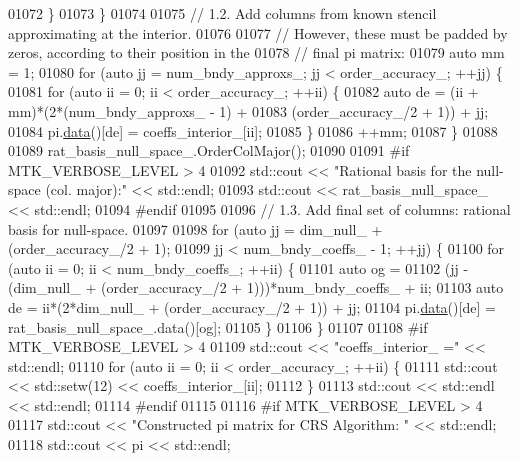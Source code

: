 \begin{DoxyCode}
{{01072     \}
01073   \}
01074 
01075   \textcolor{comment}{// 1.2. Add columns from known stencil approximating at the interior.}
01076 
01077   \textcolor{comment}{// However, these must be padded by zeros, according to their position in the}
01078   \textcolor{comment}{// final pi matrix:}
01079   \textcolor{keyword}{auto} mm = 1;
01080   \textcolor{keywordflow}{for} (\textcolor{keyword}{auto} jj = num\_bndy\_approxs\_; jj < order\_accuracy\_; ++jj) \{
01081     \textcolor{keywordflow}{for} (\textcolor{keyword}{auto} ii = 0; ii < order\_accuracy\_; ++ii) \{
01082       \textcolor{keyword}{auto} de = (ii + mm)*(2*(num\_bndy\_approxs\_ - 1) +
01083         (order\_accuracy\_/2 + 1)) + jj;
01084       pi.\hyperlink{classmtk_1_1DenseMatrix_a0c33b8a9e01d157c61ddbdf807c25d84}{data}()[de] = coeffs\_interior\_[ii];
01085     \}
01086     ++mm;
01087   \}
01088 
01089   rat\_basis\_null\_space\_.OrderColMajor();
01090 
01091 \textcolor{preprocessor}{  #if MTK\_VERBOSE\_LEVEL > 4}
01092   std::cout << \textcolor{stringliteral}{"Rational basis for the null-space (col. major):"} << std::endl;
01093   std::cout << rat\_basis\_null\_space\_ << std::endl;
01094 \textcolor{preprocessor}{  #endif}
01095 
01096   \textcolor{comment}{// 1.3. Add final set of columns: rational basis for null-space.}
01097 
01098   \textcolor{keywordflow}{for} (\textcolor{keyword}{auto} jj = dim\_null\_ + (order\_accuracy\_/2 + 1);
01099        jj < num\_bndy\_coeffs\_ - 1; ++jj) \{
01100     \textcolor{keywordflow}{for} (\textcolor{keyword}{auto} ii = 0; ii < num\_bndy\_coeffs\_; ++ii) \{
01101       \textcolor{keyword}{auto} og =
01102         (jj - (dim\_null\_ + (order\_accuracy\_/2 + 1)))*num\_bndy\_coeffs\_ + ii;
01103       \textcolor{keyword}{auto} de = ii*(2*dim\_null\_ + (order\_accuracy\_/2 + 1)) + jj;
01104       pi.\hyperlink{classmtk_1_1DenseMatrix_a0c33b8a9e01d157c61ddbdf807c25d84}{data}()[de] = rat\_basis\_null\_space\_.data()[og];
01105     \}
01106   \}
01107 
01108 \textcolor{preprocessor}{  #if MTK\_VERBOSE\_LEVEL > 4}
01109   std::cout << \textcolor{stringliteral}{"coeffs\_interior\_ ="} << std::endl;
01110   \textcolor{keywordflow}{for} (\textcolor{keyword}{auto} ii = 0; ii < order\_accuracy\_; ++ii) \{
01111     std::cout << std::setw(12) << coeffs\_interior\_[ii];
01112   \}
01113   std::cout << std::endl << std::endl;
01114 \textcolor{preprocessor}{  #endif}
01115 
01116 \textcolor{preprocessor}{  #if MTK\_VERBOSE\_LEVEL > 4}
01117   std::cout << \textcolor{stringliteral}{"Constructed pi matrix for CRS Algorithm: "} << std::endl;
01118   std::cout << pi << std::endl;
}}
\end{DoxyCode}
